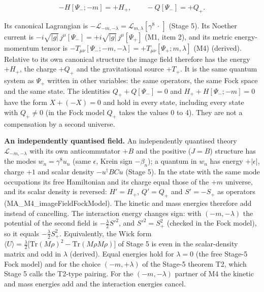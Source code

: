 \documentclass[11pt]{article}
\begin{document}
\[
-H[\Psi_-;-m]=+H_+,\qquad -Q[\Psi_-]=+Q_+ .
\]

Its canonical Lagrangian is $-\mathcal L_{-m,-\lambda}=\mathcal L_{m,\lambda}[\gamma^8\,\cdot\,]$ (Stage 5). Its Noether current is $-i\sqrt{|g|}\,j^\mu[\Psi_-]=+i\sqrt{|g|}\,j^\mu[\Psi_+]$ (M1, item 2), and its metric energy-momentum tensor is $-T_{\mu\nu}[\Psi_-;-m,-\lambda]=+T_{\mu\nu}[\Psi_+;m,\lambda]$ (M4) (derived). Relative to its own canonical structure the image field therefore has the energy $+H_+$, the charge $+Q_+$ and the gravitational source $+T_+$. It is the same quantum system as $\Psi_+$ written in other variables: the same operators, the same Fock space and the same state. The identities $Q_++Q[\Psi_-]=0$ and $H_++H[\Psi_-;-m]=0$ have the form $X+(-X)=0$ and hold in every state, including every state with $Q_+\ne0$ (in the Fock model $Q_+$ takes the values 0 to 4). They are not a compensation by a second universe.

\textbf{An independently quantised field.} An independently quantised theory $\mathcal L_{-m,-\lambda}$ with its own anticommutator $+B$ and the positive ($J=B$) structure has the modes $w_n=\gamma^8u_n$ (same $\epsilon$, Krein sign $-\beta_n$); a quantum in $w_n$ has energy $+|\epsilon|$, charge $+1$ and scalar density $-u^\dagger BCu$ (Stage 5). In the state with the same mode occupations its free Hamiltonian and its charge equal those of the $+m$ universe, and its scalar density is reversed: $H'=H_+$, $Q'=Q_+$ and $S'=-S_+$ as operators (MA\_M4\_imageFieldFockModel). The kinetic and mass energies therefore add instead of cancelling. The interaction energy changes sign: with $(-m,-\lambda)$ the potential of the second field is $-\tfrac\lambda2S'^2$, and $S'^2=S_+^2$ (checked in the Fock model), so it equals $-\tfrac\lambda2S_+^2$. Equivalently, the Wick form $\langle U\rangle=\tfrac\lambda2\bigl[\mathrm{Tr}(M\rho)^2-\mathrm{Tr}(M\rho M\rho)\bigr]$ of Stage 5 is even in the scalar-density matrix and odd in $\lambda$ (derived). Equal energies hold for $\lambda=0$ (the free Stage-5 Fock model) and for the choice $(-m,+\lambda)$ of the Stage-5 theorem T2, which Stage 5 calls the T2-type pairing. For the $(-m,-\lambda)$ partner of M4 the kinetic and mass energies add and the interaction energies cancel.
\end{document}
